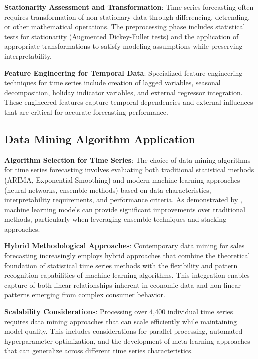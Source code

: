 \textbf{Stationarity Assessment and Transformation}: Time series forecasting often requires transformation of non-stationary data through differencing, detrending, or other mathematical operations. The preprocessing phase includes statistical tests for stationarity (Augmented Dickey-Fuller tests) and the application of appropriate transformations to satisfy modeling assumptions while preserving interpretability.

\textbf{Feature Engineering for Temporal Data}: Specialized feature engineering techniques for time series include creation of lagged variables, seasonal decomposition, holiday indicator variables, and external regressor integration. These engineered features capture temporal dependencies and external influences that are critical for accurate forecasting performance.

\subsection{Data Mining Algorithm Application}

\textbf{Algorithm Selection for Time Series}: The choice of data mining algorithms for time series forecasting involves evaluating both traditional statistical methods (ARIMA, Exponential Smoothing) and modern machine learning approaches (neural networks, ensemble methods) based on data characteristics, interpretability requirements, and performance criteria. As demonstrated by \cite{Pavlyshenko:2019}, machine learning models can provide significant improvements over traditional methods, particularly when leveraging ensemble techniques and stacking approaches.

\textbf{Hybrid Methodological Approaches}: Contemporary data mining for sales forecasting increasingly employs hybrid approaches that combine the theoretical foundation of statistical time series methods with the flexibility and pattern recognition capabilities of machine learning algorithms. This integration enables capture of both linear relationships inherent in economic data and non-linear patterns emerging from complex consumer behavior.

\textbf{Scalability Considerations}: Processing over 4,400 individual time series requires data mining approaches that can scale efficiently while maintaining model quality. This includes considerations for parallel processing, automated hyperparameter optimization, and the development of meta-learning approaches that can generalize across different time series characteristics.

